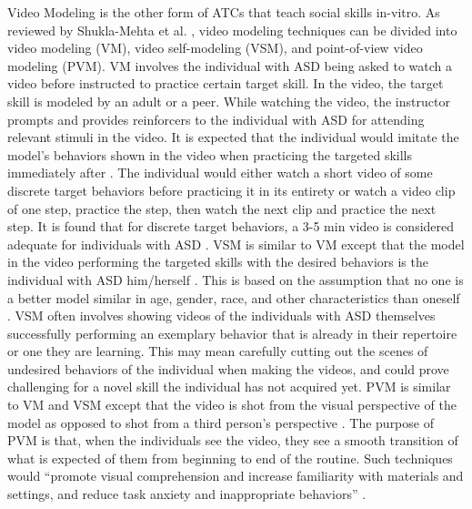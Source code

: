\documentclass{ut-thesis}
\begin{document}
Video Modeling is the other form of ATCs that teach social skills in-vitro.  As reviewed by Shukla-Mehta et al. \cite{shukla2009evaluating}, video modeling techniques can be divided into video modeling (VM), video self-modeling (VSM), and point-of-view video modeling (PVM).  VM involves the individual with ASD being asked to watch a video before instructed to practice certain target skill.  In the video, the target skill is modeled by an adult or a peer.  While watching the video, the instructor prompts and provides reinforcers to the individual with ASD for attending relevant stimuli in the video.  It is expected that the individual would imitate the model's behaviors shown in the video when practicing the targeted skills immediately after \cite{bellini2007meta, graetz2006show}.  The individual would either watch a short video of some discrete target behaviors before practicing it in its entirety or watch a video clip of one step, practice the step, then watch the next clip and practice the next step.  It is found that for discrete target behaviors, a 3-5 min video is considered adequate for individuals with ASD \cite{buggey2005video}.  VSM is similar to VM except that the model in the video performing the targeted skills with the desired behaviors is the individual with ASD him/herself \cite{hitchcock2003video}.  This is based on the assumption that no one is a better model similar in age, gender, race, and other characteristics than oneself \cite{bandura1969principles, buggey1999training}.  VSM often involves showing videos of the individuals with ASD themselves successfully performing an exemplary behavior that is already in their repertoire or one they are learning.  This may mean carefully cutting out the scenes of undesired behaviors of the individual when making the videos, and could prove challenging for a novel skill the individual has not acquired yet.  PVM is similar to VM and VSM except that the video is shot from the visual perspective of the model as opposed to shot from a third person's perspective \cite{hine2006using}.  The purpose of PVM is that, when the individuals see the video, they see a smooth transition of what is expected of them from beginning to end of the routine.  Such techniques would ``promote visual comprehension and increase familiarity with materials and settings, and reduce task anxiety and inappropriate behaviors'' \cite{shukla2009evaluating}.
\end{document}
